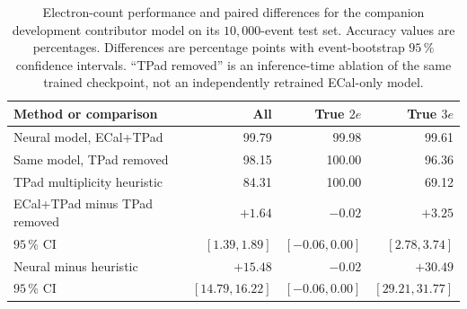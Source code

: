 \begin{table}[htbp]
    \centering
    \small
    \setlength{\tabcolsep}{5pt}
    \caption{Electron-count performance and paired differences for the
    companion development contributor model on its \(10{,}000\)-event test
    set. Accuracy values are
    percentages. Differences are percentage points with event-bootstrap
    \(95\,\%\) confidence intervals. ``TPad removed'' is an inference-time
    ablation of the same trained checkpoint, not an independently retrained
    ECal-only model.}
    \label{tab:results_tpad_count}
    \begin{tabular}{lrrr}
        \hline
        Method or comparison & All & True \(2e\) & True \(3e\) \\
        \hline
        Neural model, ECal+TPad & 99.79 & 99.98 & 99.61 \\
        Same model, TPad removed & 98.15 & 100.00 & 96.36 \\
        TPad multiplicity heuristic & 84.31 & 100.00 & 69.12 \\
        \hline
        ECal+TPad minus TPad removed & \(+1.64\) & \(-0.02\) & \(+3.25\) \\
        \(95\,\%\) CI & \([1.39,1.89]\) & \([-0.06,0.00]\) & \([2.78,3.74]\) \\
        Neural minus heuristic & \(+15.48\) & \(-0.02\) & \(+30.49\) \\
        \(95\,\%\) CI & \([14.79,16.22]\) & \([-0.06,0.00]\) & \([29.21,31.77]\) \\
        \hline
    \end{tabular}
\end{table}
